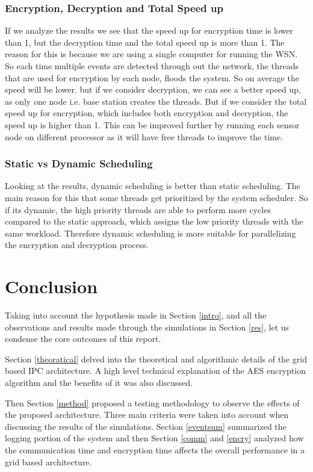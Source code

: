 \documentclass[conference]{IEEEtran}
\begin{document}
	\subsubsection{Encryption, Decryption and Total Speed up}
	  If we analyze the results we see that the speed up for encryption time is lower than 1, but the decryption time and the total speed up is more than 1. The reason for this is because we are using a single computer for running the WSN. So each time multiple events are detected through out the network, the threads that are used for encryption by each node, floods the system. So on average the speed will be lower. but if we consider decryption, we can see a better speed up, as only one node i.e. base station creates the threads. But if we consider the total speed up for encryption, which includes both encryption and decryption, the speed up is higher than 1. This can be improved further by running each sensor node on different processor as it will have free threads to improve the time.
	  
	  \subsubsection{Static vs Dynamic Scheduling}
	  
	  Looking at the results, dynamic scheduling is better than static scheduling. The main reason for this that some threads get prioritized by the system scheduler. So if its dynamic, the high priority threads are able to perform more cycles compared to the static approach, which assigns the low priority threads with the same workload. Therefore dynamic scheduling is more suitable for parallelizing the encryption and decryption process.
	  

	\section{Conclusion}
	
	Taking into account the hypothesis made in Section \ref{intro}, and all the observations and results made through the simulations in Section \ref{res}, let us condense the core outcomes of this report. 
	
	Section \ref{theoratical} delved into the theoretical and algorithmic details of the grid based IPC architecture. A high level technical explanation of the AES encryption algorithm and the benefits of it was also discussed. 
	
	Then Section \ref{method} proposed a testing methodology to observe the effects of the proposed architecture. Three main criteria were taken into account when discussing the results of the simulations. Section \ref{eventsum} summarized the logging portion of the system and then Section \ref{comm} and \ref{encry} analyzed how the communication time and encryption time affects the overall performance in a grid based architecture.
	
\end{document}
